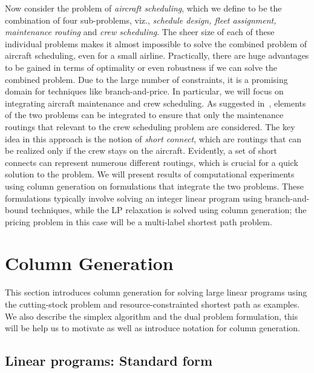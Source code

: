 \documentclass[letterpaper, 10pt, twocolumn, reqno]{amsart}
\begin{document}
Now consider the problem of \emph{aircraft scheduling}, which we define to be the combination of four sub-problems, viz., \emph{schedule design, fleet assignment, maintenance routing} and \emph{crew scheduling}. The sheer size of each of these individual problems makes it almost impossible to solve the combined problem of aircraft scheduling, even for a small airline. Practically, there are huge advantages to be gained in terms of optimality or even robustness if we can solve the combined problem. Due to the large number of constraints, it is a promising domain for techniques like branch-and-price. In particular, we will focus on integrating aircraft maintenance and crew scheduling. As suggested in~\cite{cohn2003improving}, elements of the two problems can be integrated to ensure that only the maintenance routings that relevant to the crew scheduling problem are considered. The key idea in this approach is the notion of \emph{short connect}, which are routings that can be realized only if the crew stays on the aircraft. Evidently, a set of short connects can represent numerous different routings, which is crucial for a quick solution to the problem. We will present results of computational experiments using column generation on formulations that integrate the two problems. These formulations typically involve solving an integer linear program using branch-and-bound techniques, while the LP relaxation is solved using column generation; the pricing problem in this case will be a multi-label shortest path problem.

\section{Column Generation}
\label{sec:column_generation}

This section introduces column generation for solving large linear programs using the cutting-stock problem and resource-constrainted shortest path as examples. We also describe the simplex algorithm and the dual problem formulation, this will be help us to motivate as well as introduce notation for column generation.

\subsection{Linear programs: Standard form}
\label{ssec:lp_standard}
\end{document}
